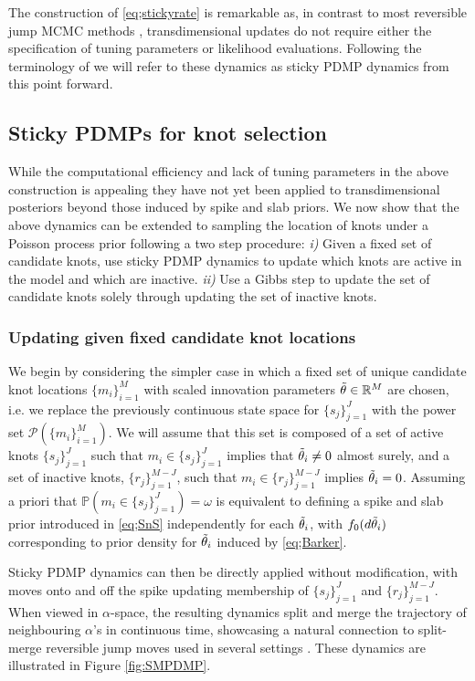 \documentclass[ba,preprint]{imsart}
\theoremstyle{plain}
\theoremstyle{definition}
\theoremstyle{remark}
\begin{document}
The construction of \eqref{eq;stickyrate} is remarkable as, in contrast to most reversible jump MCMC methods \citep{Green1995}, transdimensional updates do not require either the specification of tuning parameters or likelihood evaluations. Following the terminology of \cite{Bierkens2023a} we will refer to these dynamics as sticky PDMP dynamics from this point forward.

\subsection{Sticky PDMPs for knot selection}
\label{sec;PDMP_knot}

While the computational efficiency and lack of tuning parameters in the above construction is appealing they have not yet been applied to transdimensional posteriors beyond those induced by spike and slab priors. We now show that the above dynamics can be extended to sampling the location of knots under a Poisson process prior following a two step procedure: \textit{i)} Given a fixed set of candidate knots, use sticky PDMP dynamics to update which knots are active in the model and which are inactive. \textit{ii)} Use a Gibbs step to update the set of candidate knots solely through updating the set of inactive knots. 

\subsubsection{Updating given fixed candidate knot locations}

We begin by considering the simpler case in which a fixed set of unique candidate knot locations $\{m_i\}_{i=1}^M$ with scaled innovation parameters $\Tilde{\theta} \in \mathbb{R}^M$ are chosen, {\color{red}i.e. we replace the previously continuous state space for $\{s_j\}_{j=1}^J$ with the power set $\mathcal{P}(\{m_i\}_{i=1}^M)$}. We will assume that this set is composed of a set of active knots $\{s_j\}_{j=1}^J$ such that $m_i \in \{s_j\}_{j=1}^J$ implies that $\Tilde{\theta}_i \neq 0$ almost surely, and a set of inactive knots, $\{r_j\}_{j=1}^{M-J}$, such that $m_i \in \{r_j\}_{j=1}^{M-J}$ implies $\Tilde{\theta}_i = 0$. Assuming a priori that $\mathbb{P}(m_i \in \{s_j\}_{j=1}^J) = \omega$ is equivalent to defining a spike and slab prior introduced in \eqref{eq;SnS} independently for each $\Tilde{\theta}_i$, with $f_0(d\Tilde{\theta}_i)$ corresponding to prior density for $\Tilde{\theta}_i$ induced by \eqref{eq;Barker}.

Sticky PDMP dynamics can then be directly applied without modification, with moves onto and off the spike updating membership of $\{s_j\}_{j=1}^J$ and $\{r_j\}_{j=1}^{M-J}$. When viewed in $\alpha$-space, the resulting dynamics split and merge the trajectory of neighbouring $\alpha$'s in continuous time, showcasing a natural connection to split-merge reversible jump moves used in several settings \citep{Brooks2003}. These dynamics are illustrated in Figure \ref{fig:SMPDMP}. 
\end{document}
